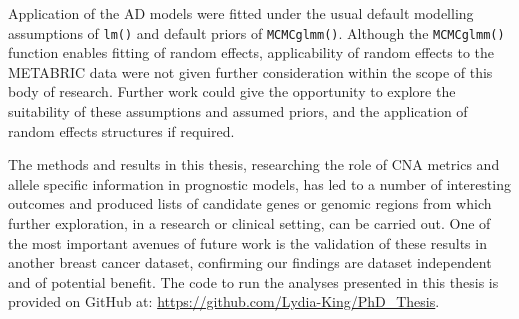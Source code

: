 Application of the AD models were fitted under the usual default modelling assumptions of \texttt{lm()} and default priors of \texttt{MCMCglmm()}. Although the \texttt{MCMCglmm()} function enables fitting of random effects, applicability of random effects to the METABRIC data were not given further consideration within the scope of this body of research. Further work could give the opportunity to explore the suitability of these assumptions and assumed priors, and the application of random effects structures if required. 

The methods and results in this thesis, researching the role of CNA metrics and allele specific information in prognostic models, has led to a number of interesting outcomes and produced lists of candidate genes or genomic regions from which further exploration, in a research or clinical setting, can be carried out. One of the most important avenues of future work is the validation of these results in another breast cancer dataset, confirming our findings are dataset independent and of potential benefit. The code to run the analyses presented in this thesis is provided on GitHub at: \href{https://github.com/Lydia-King/PhD_Thesis}{https://github.com/Lydia-King/PhD\_Thesis}.  